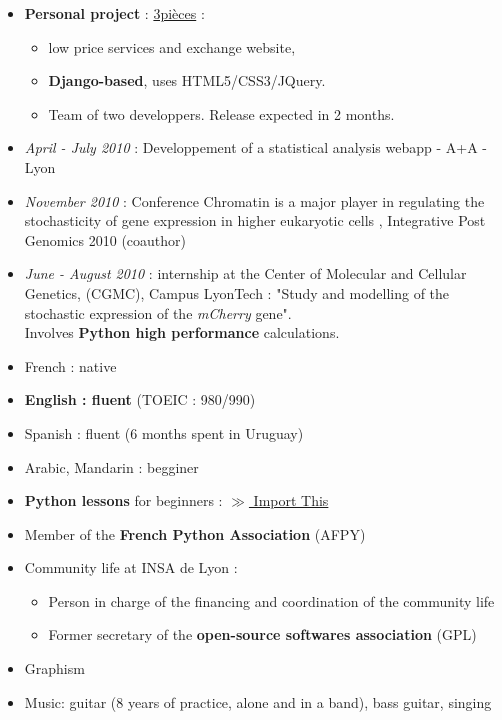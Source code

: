 \begin{itemize}
\renewcommand{\labelitemi}{$\circ$}
	   \item \textbf{Personal project} : \href{http://3piec.es}{3pièces} :
	   	\begin{itemize}
	   	\item low price \og services and exchange \fg{} website, 
	   	\item \textbf{Django-based}, uses HTML5/CSS3/JQuery.
	   	\item Team of two developpers. Release expected in 2 months.
	   	\end{itemize}
	   \item \emph{April - July 2010} : Developpement of a statistical analysis webapp - A+A - Lyon
       \item \textit{November 2010} : Conference \og Chromatin is a major player in regulating the stochasticity of gene expression in higher eukaryotic cells \fg{}, Integrative Post Genomics 2010 (coauthor)
       \item \textit{June - August 2010} : internship at the Center of Molecular and Cellular Genetics, (CGMC), Campus LyonTech : "Study and modelling of the stochastic expression of the \textit{mCherry} gene". \\Involves \textbf{Python high performance} calculations.
\end{itemize}


    \begin{itemize}
    \renewcommand{\labelitemi}{$\circ$}
    \item French : native
    \item \textbf{English : fluent} (TOEIC : 980/990)
    \item Spanish : fluent (6 months spent in Uruguay) 
    \item Arabic, Mandarin : begginer
\end{itemize}
    
\begin{itemize}
\renewcommand{\labelitemi}{$\circ$}
	\item \textbf{Python lessons} for beginners : \href{http://importthis.tumblr.com}{$\gg$ Import This}
	\item Member of the \textbf{French Python Association} (AFPY) 
	\item Community life at INSA de Lyon :
	\begin{itemize}
		\item Person in charge of the financing and coordination of the community life
		\item Former secretary of the \textbf{open-source softwares association} (GPL) 
	\end{itemize}
    \item Graphism
    \item Music: guitar (8 years of practice, alone and in a band), bass guitar, singing    
\end{itemize}



